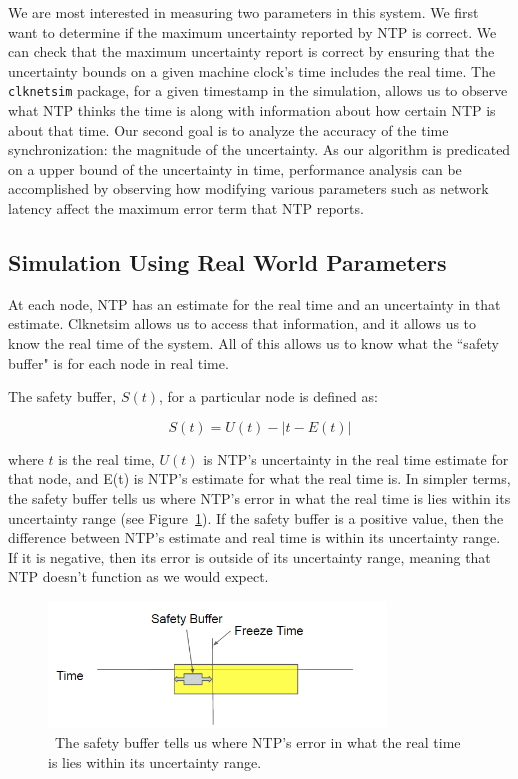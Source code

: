 We are most interested in measuring two parameters in this system. We
first want to determine if the maximum uncertainty reported by NTP is
correct. We can check that the maximum uncertainty report is correct
by ensuring that the uncertainty bounds on a given machine clock's
time includes the real time.  The \texttt{clknetsim} package, for a
given timestamp in the simulation, allows us to observe what NTP
thinks the time is along with information about how certain NTP is
about that time. Our second goal is to analyze the accuracy of the
time synchronization: the magnitude of the uncertainty.  As our
algorithm is predicated on a upper bound of the uncertainty in time,
performance analysis can be accomplished by observing how modifying
various parameters such as network latency affect the maximum error
term that NTP reports.

\subsection{Simulation Using Real World Parameters}

At each node, NTP has an estimate for the real time and an uncertainty
in that estimate. Clknetsim allows us to access that information, and
it allows us to know the real time of the system. All of this allows
us to know what the ``safety buffer" is for each node in real time.

The safety buffer, $S(t)$,  for a particular node is defined as:

\[ S(t) = U(t) - | t - E(t)| \]

where $t$ is the real time, $U(t)$ is NTP's uncertainty in the real
time estimate for that node, and E(t) is NTP's estimate for what the
real time is. In simpler terms, the safety buffer tells us where NTP's
error in what the real time is lies within its uncertainty range (see
Figure~\ref{fig:safety-diag}). If the safety buffer is a positive
value, then the difference between NTP's estimate and real time is
within its uncertainty range. If it is negative, then its error is
outside of its uncertainty range, meaning that NTP doesn't function as
we would expect.

\begin{figure}[!htbp]
  \caption{~The safety buffer tells us where NTP's error in what the real time is lies within its uncertainty range.} 
  \label{fig:safety-diag}
  \centering
  \includegraphics[width=0.8\textwidth]{safety-diagram.png}
\end{figure}

